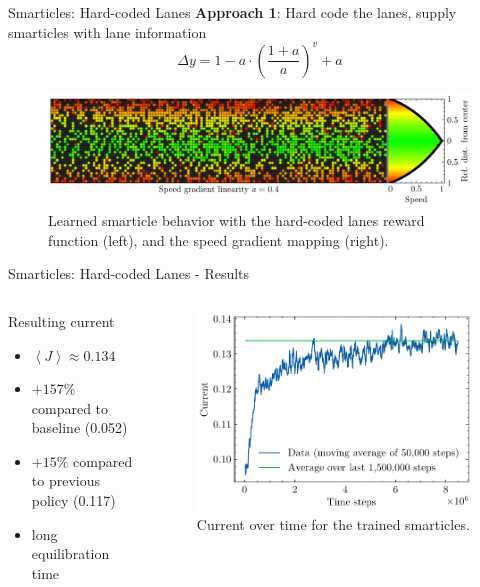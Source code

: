 \documentclass[10pt,xcolor=table, aspectratio=1610]{beamer}
\begin{document}
\begin{frame}{Smarticles: Hard-coded Lanes}
  \textbf{Approach 1}: Hard code the lanes, supply smarticles with lane information\\
  \begin{equation*}
    \Delta y = 1-a\cdot\left(\frac{1+a}{a}\right)^v+a
  \end{equation*}
  \begin{figure}
    \includegraphics[width=\textwidth]{../Thesis/img/results/speed_gradient_0.4.pdf}
    \caption*{Learned smarticle behavior with the hard-coded lanes reward function (left), and the speed gradient mapping (right).}
  \end{figure}
\end{frame}

\begin{frame}{Smarticles: Hard-coded Lanes - Results}
  \begin{columns}
    \begin{block}{Resulting current}
      \begin{itemize}
        \item $\left\langle J \right\rangle \approx 0.134$
        \item $+157\%$ compared to baseline (0.052)
        \item $+15\%$ compared to previous policy (0.117)
        \item long equilibration time
      \end{itemize}
    \end{block}
    \begin{figure}
        \includegraphics[width=\textwidth]{../Thesis/img/results/speed_grad_current.pdf}
        \caption*{Current over time for the trained smarticles.}
      \end{figure}
  \end{columns}
\end{frame}
\end{document}
